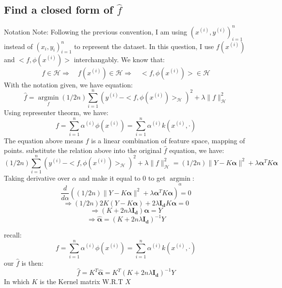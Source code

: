 \documentclass[twoside]{article}
\theoremstyle{definition}
\theoremstyle{definition}
\theoremstyle{remark}
\def\H{{\mathcal H}}
\begin{document}
\subsection{Find a closed form of $\hat f$}
Notation Note: Following the previous convention, I am using ${(x^{(i)},y^{(i)})}_{i=1}^n$ instead of ${(x_i,y_i)}_{i=1}^n$ to represent the dataset.
In this question, I use $f(x^{(i)})$ and $<f, \phi(x^{(i)})>$ interchangably. 
We know that:
\[ f \in \H \Rightarrow \quad f(x^{(i)}) \in \H \Rightarrow \quad <f, \phi(x^{(i)})> \in \H\]
With the notation given, we have equation:
\[ \hat f = \underset{f}{\operatorname{argmin}}(1/2n) \sum_{i=1}^n (y^{(i)} -  <f, \phi(x^{(i)})>_\H)^2 + \lambda \|f\|_\H^2\]
Using representer theorm, we have:
\[ f = \sum_{i=1}^n\alpha^{(i)}\phi(x^{(i)})= \sum_{i=1}^n\alpha^{(i)}k(x^{(i)},\cdot)\]
The equation above means $f$ is a linear combination of feature space, mapping of points. substitute the relation above into the original $\hat f$ equation, we have:
\[(1/2n) \sum_{i=1}^n (y^{(i)} -  <f, \phi(x^{(i)})>_\H)^2 + \lambda \|f\|_\H^2=(1/2n)\|Y-K\boldsymbol\alpha\|^2+\lambda\boldsymbol\alpha^TK\boldsymbol\alpha\]
Taking derivative over $\alpha$ and make it equal to 0 to get $\underset{\alpha}{\operatorname{argmin}}$:
\[\frac{d}{d\alpha}((1/2n)\|Y-K\boldsymbol\alpha\|^2+\lambda\boldsymbol\alpha^TK\boldsymbol\alpha) = 0\]
\[\Rightarrow(1/2n) 2K(Y - K\boldsymbol\alpha)+2\lambda\mathbf{I_d}K\boldsymbol\alpha = 0\]
\[\Rightarrow (K+ 2n\lambda\mathbf{I_d})\boldsymbol\alpha = Y\]
\[\Rightarrow \boldsymbol{\hat \alpha} = (K +  2n\lambda\mathbf{I_d})^{-1}Y\]

recall:
\[ f = \sum_{i=1}^n\alpha^{(i)}\phi(x^{(i)})= \sum_{i=1}^n\alpha^{(i)}k(x^{(i)},\cdot)\]
our $\hat f$ is then:
\[\hat f = K^T\boldsymbol{\hat \alpha}= K^T (K +  2n\lambda\mathbf{I_d})^{-1}Y\] In which $K$ is the Kernel matrix W.R.T $X$
\end{document}
